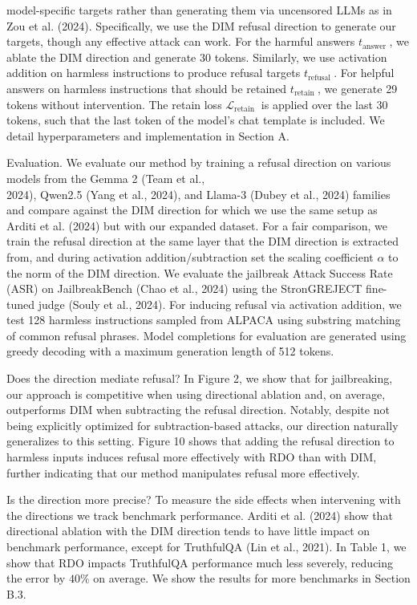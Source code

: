 \documentclass[10pt]{article}
\begin{document}
model-specific targets rather than generating them via uncensored LLMs as in Zou et al. (2024). Specifically, we use the DIM refusal direction to generate our targets, though any effective attack can work. For the harmful answers $t_{\text {answer }}$, we ablate the DIM direction and generate 30 tokens. Similarly, we use activation addition on harmless instructions to produce refusal targets $t_{\text {refusal }}$. For helpful answers on harmless instructions that should be retained $t_{\text {retain }}$, we generate 29 tokens without intervention. The retain loss $\mathcal{L}_{\text {retain }}$ is applied over the last 30 tokens, such that the last token of the model's chat template is included. We detail hyperparameters and implementation in Section A.

Evaluation. We evaluate our method by training a refusal direction on various models from the Gemma 2 (Team et al.,\\
2024), Qwen2.5 (Yang et al., 2024), and Llama-3 (Dubey et al., 2024) families and compare against the DIM direction for which we use the same setup as Arditi et al. (2024) but with our expanded dataset. For a fair comparison, we train the refusal direction at the same layer that the DIM direction is extracted from, and during activation addition/subtraction set the scaling coefficient $\alpha$ to the norm of the DIM direction. We evaluate the jailbreak Attack Success Rate (ASR) on JailbreakBench (Chao et al., 2024) using the StronGREJECT fine-tuned judge (Souly et al., 2024). For inducing refusal via activation addition, we test 128 harmless instructions sampled from ALPACA using substring matching of common refusal phrases. Model completions for evaluation are generated using greedy decoding with a maximum generation length of 512 tokens.

Does the direction mediate refusal? In Figure 2, we show that for jailbreaking, our approach is competitive when using directional ablation and, on average, outperforms DIM when subtracting the refusal direction. Notably, despite not being explicitly optimized for subtraction-based attacks, our direction naturally generalizes to this setting. Figure 10 shows that adding the refusal direction to harmless inputs induces refusal more effectively with RDO than with DIM, further indicating that our method manipulates refusal more effectively.

Is the direction more precise? To measure the side effects when intervening with the directions we track benchmark performance. Arditi et al. (2024) show that directional ablation with the DIM direction tends to have little impact on benchmark performance, except for TruthfulQA (Lin et al., 2021). In Table 1, we show that RDO impacts TruthfulQA performance much less severely, reducing the error by $40 \%$ on average. We show the results for more benchmarks in Section B.3.
\end{document}

